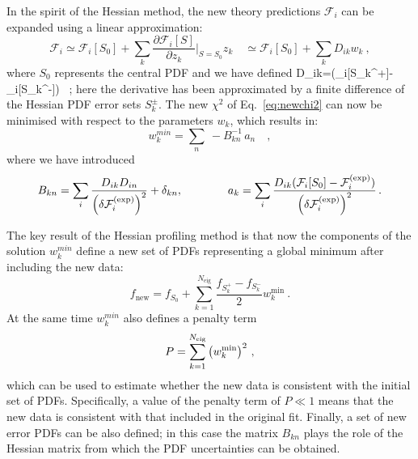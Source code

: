 In the spirit of the Hessian method, the new theory predictions $\mathcal{F}_i$ can be expanded
using a linear approximation:
\begin{equation}
\mathcal{F}_i \simeq \mathcal{F}_i[S_0] + \sum_k \frac{\partial\mathcal{F}_i[S]}{\partial z_k}\bigg|_{S=S_0} z_k \quad
              \simeq \mathcal{F}_i[S_0] + \sum_k D_{ik} w_k \ ,
\end{equation}
where $S_0$ represents the central PDF and we have defined
\be
D_{ik}=(_i[S_k^+]-_i[S_k^-]) \, ;
\ee
here the  derivative has been approximated by a finite difference of the 
Hessian PDF error sets $S_k^{\pm}$.
%
The new $\chi^2$ of Eq.~\eqref{eq:newchi2} can now be minimised with respect to the parameters $w_k$,
which results in:
\begin{equation}
%
w_k^{min}  = \sum_n \ -B_{kn}^{-1} \, a_n \quad ,
\end{equation}
where we have introduced
\begin{equation}
B_{kn} = \sum_i {{D_{ik}D_{in}}\over {\left(\delta\mathcal{F}_i^{\rm(exp)}\right)^2}} + \delta_{kn},
\qquad
\qquad
a_k = \sum_i {{D_{ik}(\mathcal{F}_i[S_0] - \mathcal{F}_i^{\rm(exp)})}\over {\left(\delta\mathcal{F}_i^{\rm(exp)}\right)^2}} \, . 
\end{equation}

The key result of the Hessian profiling method
is that now the components of the solution 
$w_k^{min}$
define a new set
of PDFs representing a global minimum after including the new data:
\begin{equation}
f_{\text{new}} = f_{S_0} + \sum_{k=1}^{N_{\text{eig}}} \frac{f_{S_k^+}-f_{S_k^-}}{2} w_k^{\text{min}} \ .
\end{equation}
At the same time 
$w_k^{min}$
also  defines  a penalty term 
\begin{equation}
P = \sum_{k=1}^{N_{\text{eig}}} \left( w_k^{\text{min}} \right)^2 \, ,
\end{equation}
which can be used to estimate whether the new data is consistent with the initial set of PDFs.
%
Specifically, a value of
the penalty term of $P\ll1$ means that the new data is consistent
with that included in the original fit.
%
Finally, a set of new error PDFs can be also defined; in this case the matrix $B_{kn}$ plays the role of
the Hessian matrix from which the PDF uncertainties
can be obtained. 

